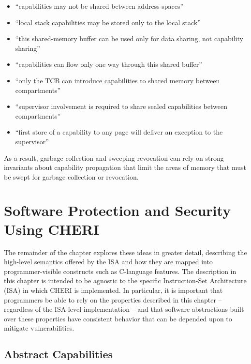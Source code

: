 \begin{itemize}
\item ``capabilities may not be shared between address spaces''
\item ``local stack capabilities may be stored only to the local stack''
\item ``this shared-memory buffer can be used only for data sharing, not
  capability sharing''
\item ``capabilities can flow only one way through this shared buffer''
\item ``only the TCB can introduce capabilities to shared memory between
  compartments''
\item ``supervisor involvement is required to share sealed capabilities
  between compartments''
\item ``first store of a capability to any page will deliver an exception to
  the supervisor''
\end{itemize}

\noindent
As a result, garbage collection and sweeping revocation can rely on strong
invariants about capability propagation that limit the areas of memory that
must be swept for garbage collection or revocation.

\section{Software Protection and Security Using CHERI}
\label{sec:software-protection-using-cheri}

The remainder of the chapter explores these ideas in greater detail,
describing the high-level semantics
 offered
by the ISA and how they are mapped
into programmer-visible constructs such as C-language features.
The description in this chapter is intended to be agnostic to the specific
Instruction-Set Architecture (ISA) in which CHERI is implemented.  
In particular, it is important that programmers be able to rely on the
properties described in this chapter -- regardless of the ISA-level
implementation -- 
and that software abstractions built over these properties have 
consistent behavior that can be depended upon to mitigate vulnerabilities.

\subsection{Abstract Capabilities}

